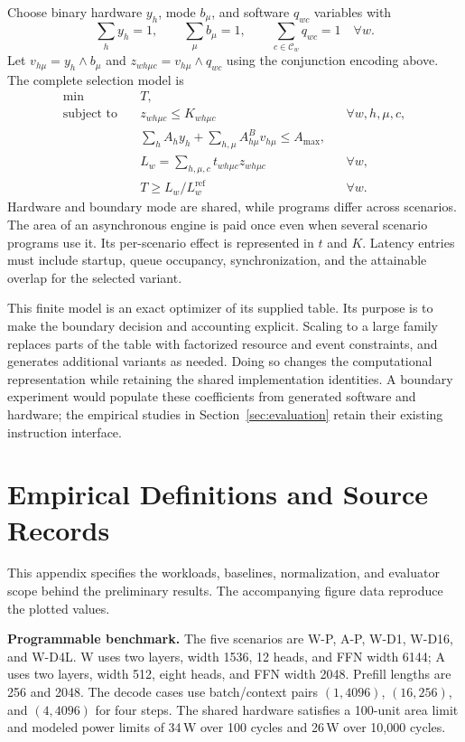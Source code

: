 Choose binary hardware $y_h$, mode $b_\mu$, and software $q_{wc}$ variables with
\begin{equation}
 \sum_h y_h=1,\qquad \sum_\mu b_\mu=1,\qquad
 \sum_{c\in\mathcal C_w}q_{wc}=1\quad\forall w.
\end{equation}
Let $v_{h\mu}=y_h\land b_\mu$ and $z_{wh\mu c}=v_{h\mu}\land q_{wc}$ using the conjunction encoding above. The complete selection model is
\begin{align}
 \min\quad &T,\nonumber\\
 \text{subject to}\quad
 &z_{wh\mu c}\le K_{wh\mu c} &&\forall w,h,\mu,c,\nonumber\\
 &\sum_h A_hy_h+\sum_{h,\mu}A^B_{h\mu}v_{h\mu}\le A_{\max},\label{eq:finite-boundary}\\
 &L_w=\sum_{h,\mu,c}t_{wh\mu c}z_{wh\mu c} &&\forall w,\nonumber\\
 &T\ge L_w/L_w^{\mathrm{ref}} &&\forall w.\nonumber
\end{align}
Hardware and boundary mode are shared, while programs differ across scenarios. The area of an asynchronous engine is paid once even when several scenario programs use it. Its per-scenario effect is represented in $t$ and $K$. Latency entries must include startup, queue occupancy, synchronization, and the attainable overlap for the selected variant.

This finite model is an exact optimizer of its supplied table. Its purpose is to make the boundary decision and accounting explicit. Scaling to a large family replaces parts of the table with factorized resource and event constraints, and generates additional variants as needed. Doing so changes the computational representation while retaining the shared implementation identities. A boundary experiment would populate these coefficients from generated software and hardware; the empirical studies in Section~\ref{sec:evaluation} retain their existing instruction interface.

\section{Empirical Definitions and Source Records}\label{app:evidence}
This appendix specifies the workloads, baselines, normalization, and evaluator scope behind the preliminary results. The accompanying figure data reproduce the plotted values.

\textbf{Programmable benchmark.}
The five scenarios are W-P, A-P, W-D1, W-D16, and W-D4L. W uses two layers, width 1536, 12 heads, and FFN width 6144; A uses two layers, width 512, eight heads, and FFN width 2048. Prefill lengths are 256 and 2048. The decode cases use batch/context pairs $(1,4096)$, $(16,256)$, and $(4,4096)$ for four steps. The shared hardware satisfies a 100-unit area limit and modeled power limits of 34\,W over 100 cycles and 26\,W over 10,000 cycles.

